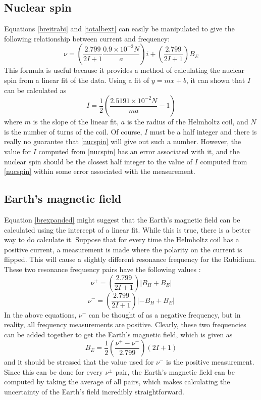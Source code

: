 \documentclass[11pt,letterpaper]{article}
\begin{document}
\subsection{Nuclear spin}

Equations \eqref{breitrabi} and \eqref{totalbext} can easily be manipulated to
give the following relationship between current and frequency:
\begin{equation}
    \nu = \left(\frac{2.799}{2I+1}\frac{0.9\times 10^{-2} N}{a} \right) i
        + \left(\frac{2.799}{2I+1}\right) B_E
    \label{brexpanded}
\end{equation}
This formula is useful because it provides a method of calculating the nuclear
spin from a linear fit of the data. Using a fit of $y = mx + b$, it can shown
that $I$ can be calculated as
\begin{equation}
    I = \frac{1}{2}\left(\frac{2.5191 \times 10^{-2} N}{ma} - 1\right)
    \label{nucspin}
\end{equation}
where $m$ is the slope of the linear fit, $a$ is the radius of the Helmholtz
coil, and $N$ is the number of turns of the coil. Of course, $I$ must be a half
integer and there is really no guarantee that \eqref{nucspin} will give out such
a number. However, the value for $I$ computed from \eqref{nucspin} has an error
associated with it, and the nuclear spin should be the closest half integer to
the value of $I$ computed from \eqref{nucspin} within some error associated with
the measurement.

\subsection{Earth's magnetic field}

Equation \eqref{brexpanded} might suggest that the Earth's magnetic field can be
calculated using the intercept of a linear fit. While this is true, there is a
better way to do calculate it. Suppose that for every time the Helmholtz coil
has a positive current, a measurement is made where the polarity on the current
is flipped. This will cause a slightly different resonance frequency for the
Rubidium. These two resonance frequency pairs have the following values
\cite{LabManual}:
\begin{equation}
    \nu^+ = \left(\frac{2.799}{2I+1}\right) \left|B_H + B_E\right|
\end{equation}
\begin{equation}
    \nu^- = \left(\frac{2.799}{2I+1}\right) \left|-B_H + B_E\right|
\end{equation}
In the above equations, $\nu^-$ can be thought of as a negative frequency, but
in reality, all frequency measurements are positive. Clearly, these two
frequencies can be added together to get the Earth's magnetic field, which is
given as
\begin{equation}
    B_E = \frac{1}{2}\left(\frac{\nu^+-\nu^-}{2.799}\right) (2I+1)
\end{equation}
and it should be stressed that the value used for $\nu^-$ is the positive
measurement. Since this can be done for every $\nu^\pm$ pair, the Earth's
magnetic field can be computed by taking the average of all pairs, which makes
calculating the uncertainty of the Earth's field incredibly straightforward.
\end{document}
